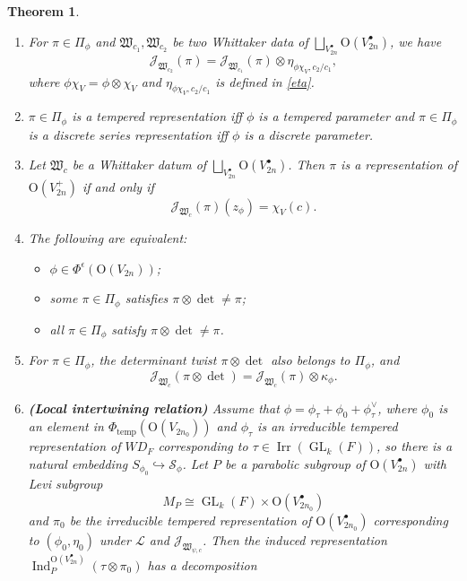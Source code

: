 \documentclass[article]{article}
\numberwithin{equation}{section}
\newtheorem{theorem}{Theorem}[section]
\theoremstyle{definition}
\DeclareMathOperator{\Ind}{Ind}
\DeclareMathOperator{\GL}{GL}
\DeclareMathOperator{\Irr}{Irr}
\begin{document}
\begin{theorem}
\begin{enumerate}[(1).]
		\item 
		For $\pi\in \Pi_{\phi}$ and $\mathfrak W_{c_1},\mathfrak W_{c_2}$ be two Whittaker data of $\bigsqcup_{V_{2n}^{\bullet}}\mathrm O(V_{2n}^{\bullet})$, we have 
		$$
		\mathcal J_{\mathfrak W_{c_2}}(\pi)=\mathcal J_{\mathfrak W_{c_1}}(\pi)\otimes \eta_{\phi\chi_{V},c_2/c_1},
		$$
		where $\phi\chi_{V}=\phi\otimes\chi_{V}$ and $\eta_{\phi\chi_{V},c_2/c_1}$ is defined in \ref{eta}. 
		\item
		$\pi\in \Pi_{\phi}$ is a tempered representation iff $\phi$ is a tempered parameter and $\pi\in \Pi_{\phi}$ is a discrete series representation iff $\phi$ is a discrete parameter.
		\item
		Let $\mathfrak W_c$ be a Whittaker datum of $\bigsqcup_{V_{2n}^{\bullet}}\mathrm O(V_{2n}^\bullet)$. Then $\pi$ is a representation of $\mathrm O(V_{2n}^+)$ if and only if
		$$\mathcal J_{\mathfrak W_{c}}(\pi)(z_\phi)=  \chi_{V}(c).$$
		\item
		The following are equivalent:
		\begin{itemize}
			\item 	$\phi \in \Phi^{\epsilon}\left(\mathrm{O}\left(V_{2 n}\right)\right)$;
			\item some $\pi\in \Pi_{\phi}$ satisfies $\pi \otimes \det \neq \pi$;
			\item all $\pi\in \Pi_{\phi}$ satisfy $\pi \otimes\det 
			\neq \pi$. 
		\end{itemize}
	    \item
		 For $\pi\in \Pi_{\phi}$, the determinant twist $\pi\otimes \det$ also belongs to $\Pi_{\phi}$, and 
		$$\mathcal J_{\mathfrak W_{c}}(\pi \otimes \det)=\mathcal J_{\mathfrak W_{c}}(\pi)\otimes  \kappa_{\phi}.$$
		\item
		\textbf{(Local intertwining relation)}
		Assume that $\phi=\phi_{\tau}+\phi_{0}+\phi_{\tau}^{\vee}$, where $\phi_{0}$ is an element in $\Phi_{\mathrm {temp}}\left(\mathrm O(V_{2n_0})\right)$
		and $\phi_{\tau}$ is an irreducible tempered representation of $WD_{F}$ corresponding to $\tau \in \Irr(\GL_{k}(F))$, so there is a natural embedding $S_{\phi_{0}}\hookrightarrow \mathcal {S}_{\phi}$. Let $P$ be a parabolic subgroup of $\mathrm O(V_{2n}^\bullet)$ with Levi subgroup $$M_{P}\cong \GL_{k}(F) \times \mathrm O(V_{2n_0}^\bullet)$$ and $\pi_{0}$ be the irreducible tempered representation of $\mathrm O(V_{2n_0}^\bullet)$ corresponding to $(\phi_{0},\eta_0)$ under $\mathcal L$ and $\mathcal J_{\mathfrak W_{\psi,c}}$. Then the induced representation $\Ind_{P}^{\mathrm O(V_{2n}^\bullet)}\left(\tau \otimes \pi_{0}\right)$ has a decomposition 

\end{enumerate}
\end{theorem}
\end{document}
